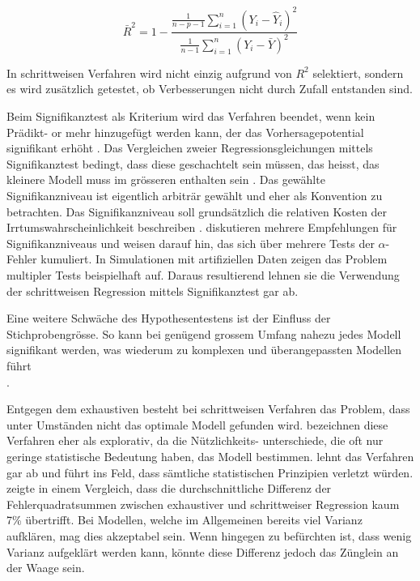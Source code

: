 \begin{equation}
\bar R^2=1-\frac{\displaystyle \frac{1}{n-p-1} \sum_{i=1}^n (Y_i-\hat{Y}_i)^2}{\displaystyle \frac{1}{n-1} \sum_{i=1}^n (Y_i-\bar{Y})^2}
\tag{korrigiertes Bestimmtheitsmass}
\end{equation}

In schrittweisen Verfahren wird nicht einzig aufgrund von $R^2$ selektiert, sondern es wird zusätzlich getestet, ob Verbesserungen nicht durch Zufall entstanden sind. 

Beim Signifikanztest als Kriterium wird das Verfahren beendet, wenn kein Prädikt- or mehr hinzugefügt werden kann, der das Vorhersagepotential signifikant erhöht \cite[p.48]{bendel1977comparison}. 
Das Vergleichen zweier Regressionsgleichungen mittels Signifikanztest bedingt, dass diese geschachtelt sein müssen, das heisst, das kleinere Modell muss im grösseren enthalten sein \cite[p. 508]{jacob2003applied}.
Das gewählte Signifikanzniveau ist eigentlich arbiträr gewählt und eher als Konvention zu betrachten. Das Signifikanzniveau soll grundsätzlich die relativen Kosten der Irrtumswahrscheinlichkeit beschreiben \cite[p. 196]{hansen1999discussion}.  diskutieren mehrere Empfehlungen für Signifikanzniveaus und weisen darauf hin, das sich über mehrere Tests der $\alpha$-Fehler kumuliert. 
In  Simulationen mit artifiziellen Daten zeigen  das  Problem multipler Tests beispielhaft auf. 
Daraus resultierend lehnen sie die Verwendung der schrittweisen Regression mittels Signifikanztest gar ab.

Eine weitere Schwäche des Hypothesentestens ist der Einfluss der Stichprobengrösse. So kann bei genügend grossem Umfang nahezu jedes Modell  signifikant werden, was wiederum zu komplexen und überangepassten Modellen führt\\ \cite[p.173]{weakliem2004introduction}.

Entgegen dem exhaustiven besteht bei schrittweisen Verfahren das Problem, dass unter Umständen nicht das optimale Modell gefunden wird. 
 bezeichnen diese Verfahren eher als explorativ, da die Nützlichkeits- unterschiede, die oft nur geringe statistische Bedeutung haben, das Modell bestimmen.
 lehnt das Verfahren gar ab und führt ins Feld, dass sämtliche statistischen Prinzipien verletzt würden. 
 zeigte in einem Vergleich, dass die durchschnittliche Differenz der Fehlerquadratsummen zwischen exhaustiver und schrittweiser Regression kaum 7\% übertrifft. Bei Modellen, welche im Allgemeinen bereits viel Varianz aufklären, mag dies akzeptabel sein. Wenn hingegen zu befürchten ist, dass wenig Varianz aufgeklärt werden kann, könnte diese Differenz jedoch das Zünglein an der Waage sein.